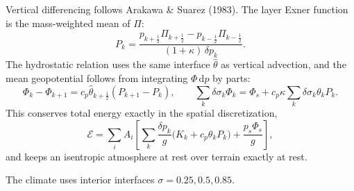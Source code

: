 \documentclass[11pt,a4paper]{article}
\newcommand{\dd}{\mathrm{d}}
\begin{document}
Vertical differencing follows Arakawa \& Suarez (1983). The layer Exner function
is the mass-weighted mean of $\Pi$:
\begin{equation}
P_k = \frac{p_{k+\frac12}\Pi_{k+\frac12} - p_{k-\frac12}\Pi_{k-\frac12}}
   {(1+\kappa)\,\delta p_k}.
\end{equation}
The hydrostatic relation uses the same interface $\hat\theta$ as vertical
advection, and the mean geopotential follows from integrating $\Phi\,\dd p$ by
parts:
\begin{equation}
\Phi_k - \Phi_{k+1} = c_p\hat\theta_{k+\frac12}(P_{k+1} - P_k), \qquad
\sum_k\delta\sigma_k\Phi_k = \Phi_s + c_p\kappa\sum_k\delta\sigma_k\theta_k P_k .
\end{equation}
This conserves total energy exactly in the spatial discretization,
\begin{equation}
\mathcal{E} = \sum_i A_i\left[\sum_k\frac{\delta p_k}{g}
   \bigl(K_k + c_p\theta_k P_k\bigr) + \frac{p_s\Phi_s}{g}\right],
\end{equation}
and keeps an isentropic atmosphere at rest over terrain exactly at rest.

The climate uses interior interfaces $\sigma = 0.25, 0.5, 0.85$.
\end{document}
